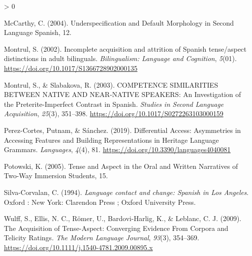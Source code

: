 \documentclass[
  english,
  man,floatsintext]{apa6}
\newlength{\cslhangindent}
\newenvironment{CSLReferences}[2] %
 {%
  \setlength{\parindent}{0pt}
  \ifodd #1 \everypar{\setlength{\hangindent}{\cslhangindent}}\ignorespaces\fi
  \ifnum #2 > 0
  \setlength{\parskip}{#2\baselineskip}
  \fi
 }%
 {}
\begin{document}
\begin{CSLReferences}{1}{0}
\leavevmode\hypertarget{ref-mccarthy_underspecification_2004}{}%
McCarthy, C. (2004). Underspecification and {Default} {Morphology} in {Second} {Language} {Spanish}, 12.

\leavevmode\hypertarget{ref-montrul_incomplete_2002}{}%
Montrul, S. (2002). Incomplete acquisition and attrition of {Spanish} tense/aspect distinctions in adult bilinguals. \emph{Bilingualism: Language and Cognition}, \emph{5}(01). \url{https://doi.org/10.1017/S1366728902000135}

\leavevmode\hypertarget{ref-montrul_competence_2003}{}%
Montrul, S., \& Slabakova, R. (2003). {COMPETENCE} {SIMILARITIES} {BETWEEN} {NATIVE} {AND} {NEAR}-{NATIVE} {SPEAKERS}: {An} {Investigation} of the {Preterite}-{Imperfect} {Contrast} in {Spanish}. \emph{Studies in Second Language Acquisition}, \emph{25}(3), 351--398. \url{https://doi.org/10.1017/S0272263103000159}

\leavevmode\hypertarget{ref-perez-cortes_differential_2019}{}%
Perez-Cortes, Putnam, \& Sánchez. (2019). Differential {Access}: {Asymmetries} in {Accessing} {Features} and {Building} {Representations} in {Heritage} {Language} {Grammars}. \emph{Languages}, \emph{4}(4), 81. \url{https://doi.org/10.3390/languages4040081}

\leavevmode\hypertarget{ref-potowski_tense_2005}{}%
Potowski, K. (2005). Tense and {Aspect} in the {Oral} and {Written} {Narratives} of {Two}-{Way} {Immersion} {Students}, 15.

\leavevmode\hypertarget{ref-silva-corvalan_language_1994}{}%
Silva-Corvalan, C. (1994). \emph{Language contact and change: {Spanish} in {Los} {Angeles}}. Oxford : New York: Clarendon Press ; Oxford University Press.

\leavevmode\hypertarget{ref-wulff_acquisition_2009}{}%
Wulff, S., Ellis, N. C., Römer, U., Bardovi-Harlig, K., \& Leblanc, C. J. (2009). The {Acquisition} of {Tense}-{Aspect}: {Converging} {Evidence} {From} {Corpora} and {Telicity} {Ratings}. \emph{The Modern Language Journal}, \emph{93}(3), 354--369. \url{https://doi.org/10.1111/j.1540-4781.2009.00895.x}

\end{CSLReferences}
\end{document}
